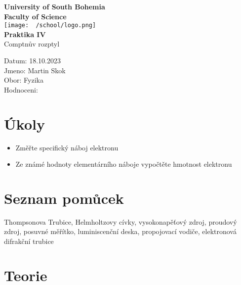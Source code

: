 \documentclass{article}
\begin{document}
\begin{center}
\textbf{\Huge{University of South Bohemia}}\\
\vspace{50px}
\textbf{\Large{Faculty of Science}} \\
\vspace{30px}
\texttt{[image: ~/school/logo.png]} \\
\vspace{30px}
\textbf{\large{Praktika IV}}
\vspace{20px}
\\
\vspace{20px}
\large{Comptnův rozptyl} \\
\vspace{60px}
\end{center}
\begin{flushleft}
Datum: 18.10.2023 \\
Jmeno: Martin Skok \\
Obor: Fyzika \\
Hodnoceni:
\end{flushleft}
\newpage
\section{Úkoly}
\begin{itemize}
  \item Změřte specifický náboj elektronu
  \item Ze známé hodnoty elementárního náboje vypočtěte hmotnost elektronu
\end{itemize}
\section{Seznam pomůcek}
Thompsonova Trubice,
Helmholtzovy cívky,
vysokonapěťový zdroj,
proudový zdroj,
posuvné měřítko,
luminiscenční deska,
propojovací vodiče,
elektronová difrakční trubice
\section{Teorie}
\end{document}
